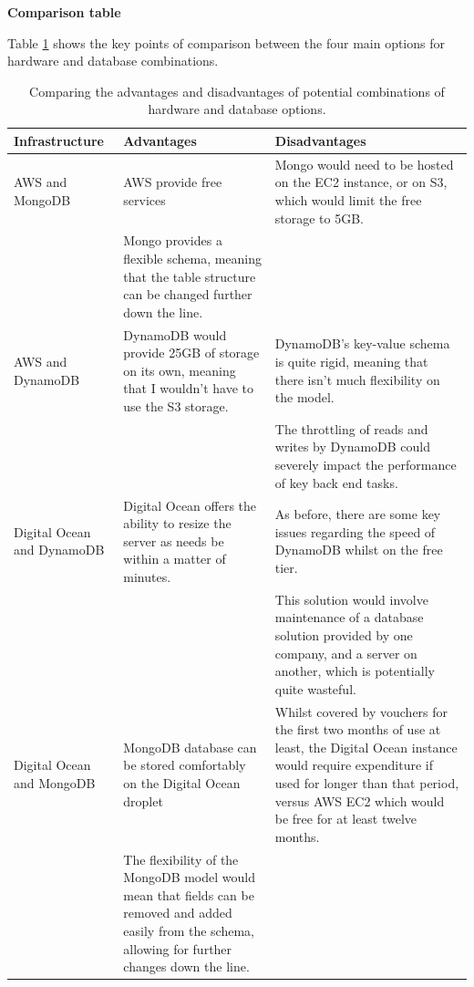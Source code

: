 \documentclass[12pt]{article}
\newcommand{\tabitem}{\makebox[1em][r]{\textbullet~}}
\begin{document}
\textbf{Comparison table}

Table \ref{infrastructuretable} shows the key points of comparison between the four main options for hardware and database combinations. \\

\begin{table}
    \begin{tabular}{p{4.5cm}|p{7.75cm}|p{7.75cm}}
    \textbf{Infrastructure} & \textbf{Advantages} & \textbf{Disadvantages} \\ \hline
    AWS and MongoDB & \tabitem AWS provide free services & \tabitem Mongo would need to be hosted on the EC2 instance, or on S3, which would limit the free storage to 5GB. \\ & \tabitem Mongo provides a flexible schema, meaning that the table structure can be changed further down the line.  \\ \hline
    AWS and DynamoDB & \tabitem DynamoDB would provide 25GB of storage on its own, meaning that I wouldn't have to use the S3 storage. & \tabitem DynamoDB's key-value schema is quite rigid, meaning that there isn't much flexibility on the model.\\ & & \tabitem The throttling of reads and writes by DynamoDB could severely impact the performance of key back end tasks.\\ \hline
    Digital Ocean and DynamoDB & \tabitem Digital Ocean offers the ability to resize the server as needs be within a matter of minutes. & \tabitem As before, there are some key issues regarding the speed of DynamoDB whilst on the free tier. \\ & &\tabitem This solution would involve maintenance of a database solution provided by one company, and a server on another, which is potentially quite wasteful.  \\ \hline
    Digital Ocean and MongoDB & \tabitem MongoDB database can be stored comfortably on the Digital Ocean droplet & \tabitem Whilst covered by vouchers for the first two months of use at least, the Digital Ocean instance would require expenditure if used for longer than that period, versus AWS EC2 which would be free for at least twelve months.\\ & \tabitem The flexibility of the MongoDB model would mean that fields can be removed and added easily from the schema, allowing for further changes down the line. \\
  \end{tabular}
  \caption[Advantages and Disadvantages of different Infrastructure combinations]{Comparing the advantages and disadvantages of potential combinations of hardware and database options.}
  \label{infrastructuretable}
\end{table}
\end{document}

